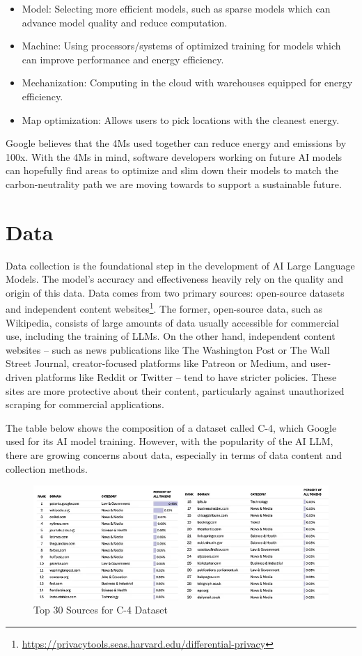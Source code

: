 \documentclass[
]{book}
\providecommand{\tightlist}{%
  \setlength{\itemsep}{0pt}\setlength{\parskip}{0pt}}
\begin{document}
\begin{itemize}
\tightlist
\item
  Model: Selecting more efficient models, such as sparse models which can advance model quality and reduce computation.
\item
  Machine: Using processors/systems of optimized training for models which can improve performance and energy efficiency.
\item
  Mechanization: Computing in the cloud with warehouses equipped for energy efficiency.
\item
  Map optimization: Allows users to pick locations with the cleanest energy.
\end{itemize}

Google believes that the 4Ms used together can reduce energy and emissions by 100x. With the 4Ms in mind, software developers working on future AI models can hopefully find areas to optimize and slim down their models to match the carbon-neutrality path we are moving towards to support a sustainable future.

\hypertarget{data}{%
\chapter{Data}\label{data}}

Data collection is the foundational step in the development of AI Large Language Models. The model's accuracy and effectiveness heavily rely on the quality and origin of this data. Data comes from two primary sources: open-source datasets and independent content websites\footnote{\url{https://privacytools.seas.harvard.edu/differential-privacy}}. The former, open-source data, such as Wikipedia, consists of large amounts of data usually accessible for commercial use, including the training of LLMs. On the other hand, independent content websites -- such as news publications like The Washington Post or The Wall Street Journal, creator-focused platforms like Patreon or Medium, and user-driven platforms like Reddit or Twitter -- tend to have stricter policies. These sites are more protective about their content, particularly against unauthorized scraping for commercial applications.

The table below shows the composition of a dataset called C-4, which Google used for its AI model training. However, with the popularity of the AI LLM, there are growing concerns about data, especially in terms of data content and collection methods.

\begin{figure}
\centering
\includegraphics{figures/figure5.png}
\caption{Top 30 Sources for C-4 Dataset}
\end{figure}
\end{document}
